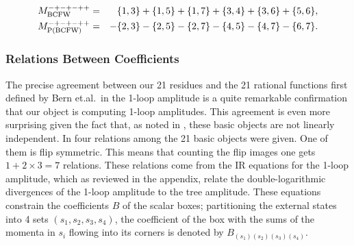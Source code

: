 \documentclass[12pt]{article}
\begin{document}
%
\begin{eqnarray}
\label{sevbcf}
M^{-+-+-++}_{{\rm BCFW}} & = & \{1,3\}+\{1,5\}+\{1,7\}+\{3,4\}+\{3,6\}+\{5,6\}, \\
M^{-+-+-++}_{{\rm P(BCFW)}} & = & -\{2,3\}-\{2,5\}-\{2,7\}-\{4,5\}-\{4,7\}-\{6,7\}.
\end{eqnarray}
%

\subsubsection{Relations Between Coefficients}

The precise agreement between our 21 residues and the 21 rational functions first defined by Bern et.al.~in the 1-loop amplitude is a quite remarkable confirmation that our object is computing 1-loop amplitudes. This agreement is
even more surprising given the fact that, as noted in \cite{Bern:2004ky}, these basic objects are not linearly independent. In \cite{Bern:2004ky} four relations among the 21 basic objects were given. One of them is flip symmetric. This means that counting the flip images one gets $1+2\times 3=7$ relations. These relations come from the IR equations for the 1-loop amplitude, which as reviewed in the appendix, relate the double-logarithmic divergences of the 1-loop amplitude to the tree amplitude. These equations constrain the coefficients $B$ of the scalar boxes; partitioning the external states into 4 sets $(s_1,s_2,s_3,s_4)$, the coefficient of the box with the sums of the momenta in $s_i$ flowing into its corners is denoted by $B_{(s_1)(s_2)(s_3)(s_4)}$.
\end{document}

